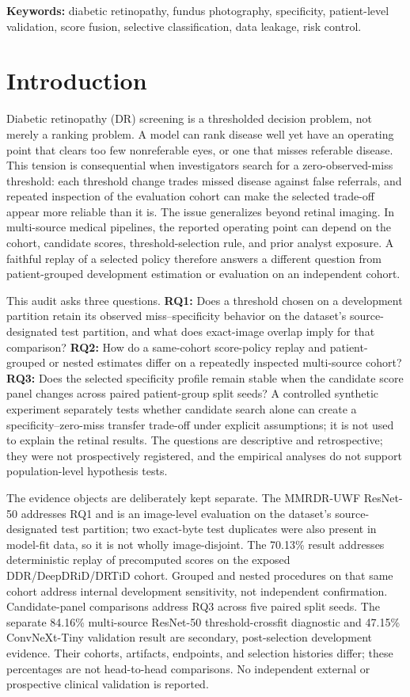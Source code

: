 \documentclass[11pt]{article}
\begin{document}
\begin{abstract}
\end{abstract}

\noindent\textbf{Keywords:} diabetic retinopathy, fundus photography, specificity, patient-level validation, score fusion, selective classification, data leakage, risk control.

\section{Introduction}
Diabetic retinopathy (DR) screening is a thresholded decision problem, not merely a ranking problem. A model can rank disease well yet have an operating point that clears too few nonreferable eyes, or one that misses referable disease. This tension is consequential when investigators search for a zero-observed-miss threshold: each threshold change trades missed disease against false referrals, and repeated inspection of the evaluation cohort can make the selected trade-off appear more reliable than it is. The issue generalizes beyond retinal imaging. In multi-source medical pipelines, the reported operating point can depend on the cohort, candidate scores, threshold-selection rule, and prior analyst exposure. A faithful replay of a selected policy therefore answers a different question from patient-grouped development estimation or evaluation on an independent cohort.

This audit asks three questions. \textbf{RQ1:} Does a threshold chosen on a development partition retain its observed miss--specificity behavior on the dataset's source-designated test partition, and what does exact-image overlap imply for that comparison? \textbf{RQ2:} How do a same-cohort score-policy replay and patient-grouped or nested estimates differ on a repeatedly inspected multi-source cohort? \textbf{RQ3:} Does the selected specificity profile remain stable when the candidate score panel changes across paired patient-group split seeds? A controlled synthetic experiment separately tests whether candidate search alone can create a specificity--zero-miss transfer trade-off under explicit assumptions; it is not used to explain the retinal results. The questions are descriptive and retrospective; they were not prospectively registered, and the empirical analyses do not support population-level hypothesis tests.

The evidence objects are deliberately kept separate. The MMRDR-UWF ResNet-50 addresses RQ1 and is an image-level evaluation on the dataset's source-designated test partition; two exact-byte test duplicates were also present in model-fit data, so it is not wholly image-disjoint. The 70.13\% result addresses deterministic replay of precomputed scores on the exposed DDR/DeepDRiD/DRTiD cohort. Grouped and nested procedures on that same cohort address internal development sensitivity, not independent confirmation. Candidate-panel comparisons address RQ3 across five paired split seeds. The separate 84.16\% multi-source ResNet-50 threshold-crossfit diagnostic and 47.15\% ConvNeXt-Tiny validation result are secondary, post-selection development evidence. Their cohorts, artifacts, endpoints, and selection histories differ; these percentages are not head-to-head comparisons. No independent external or prospective clinical validation is reported.
\end{document}
